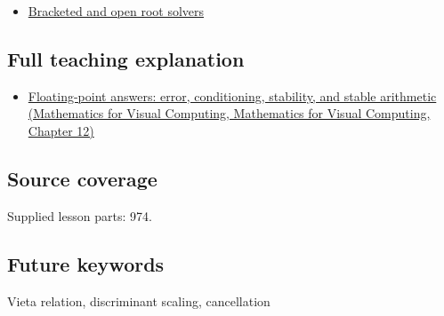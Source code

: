 \begin{itemize}
\tightlist
\item
  \hyperref[appendix-f63eb850796d]{Bracketed and open root solvers}
\end{itemize}

\subsection{Full teaching explanation}\label{appendix-b9afba7f63e5-full-teaching-explanation}

\begin{itemize}
\tightlist
\item
  \href{../02-Mathematics-for-Visual-Computing/main.pdf\#nameddest=02-foundations-ii-ch028-floating-point-answers-error-conditioning-stability-and-stable-arithmetic}{Floating-point answers: error, conditioning, stability, and stable arithmetic (Mathematics for Visual Computing, Mathematics for Visual Computing, Chapter 12)}
\end{itemize}

\subsection{Source coverage}\label{appendix-b9afba7f63e5-source-coverage}

Supplied lesson parts: 974.

\subsection{Future keywords}\label{appendix-b9afba7f63e5-future-keywords}

Vieta relation, discriminant scaling, cancellation
